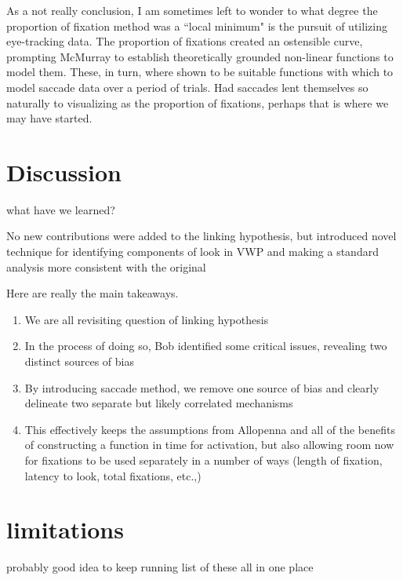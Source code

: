 As a not really conclusion, I am sometimes left to wonder to what degree the proportion of fixation method was a  ``local minimum" is the pursuit of utilizing eye-tracking data. The proportion of fixations created an ostensible curve, prompting McMurray to establish theoretically grounded non-linear functions to model them. These, in turn, where shown to be suitable functions with which to model saccade data over a period of trials. Had saccades lent themselves so naturally to visualizing as the proportion of fixations, perhaps that is where we may have started.

\section{Discussion}

what have we learned?

No new contributions were added to the linking hypothesis, but introduced novel technique for identifying components of look in VWP and making a standard analysis more consistent with the original

Here are really the main takeaways.

\begin{singlespace}
\begin{enumerate}
\vspace{-2mm}
\item We are all revisiting question of linking hypothesis
\item In the process of doing so, Bob identified some critical issues, revealing two distinct sources of bias
\item By introducing saccade method, we remove one source of bias and clearly delineate two separate but likely correlated mechanisms
\item This effectively keeps the assumptions from Allopenna and all of the benefits of constructing a function in time for activation, but also allowing room now for fixations to be used separately in a number of ways (length of fixation, latency to look, total fixations, etc.,)
\end{enumerate}
\end{singlespace}




\section{limitations}

probably good idea to keep running list of these all in one place

